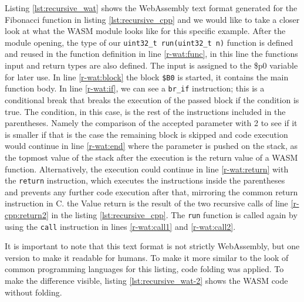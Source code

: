 



Listing \ref{lst:recursive_wat} shows the WebAssembly text format generated for the Fibonacci function in listing \ref{lst:recursive_cpp} and we would like to take a closer look at what the WASM module looks like for this specific example. After the module opening, the type of our \lstinline{uint32_t run(uint32_t n)} function is defined and reused in the function definition in line \ref{r-wat:func}, in this line the functions input and return types are also defined. The input is assigned to the \$p0 variable for later use. In line \ref{r-wat:block} the block \lstinline{$B0} is started, it contains the main function body. In line \ref{r-wat:if}, we can see a \lstinline{br_if} instruction; this is a conditional break that breaks the execution of the passed block if the condition is true. The condition, in this case, is the rest of the instructions included in the parentheses. Namely the comparison of the accepted parameter with 2 to see if it is smaller if that is the case the remaining block is skipped and code execution would continue in line \ref{r-wat:end} where the parameter is pushed on the stack, as the topmost value of the stack after the execution is the return value of a WASM function. Alternatively, the execution could continue in line \ref{r-wat:return} with the \lstinline{return} instruction, which executes the instructions inside the parentheses and prevents any further code execution after that, mirroring the common return instruction in C. the Value return is the result of the two recursive calls of line \ref{r-cpp:return2} in the listing \ref{lst:recursive_cpp}. The \lstinline{run} function is called again by using the \lstinline{call} instruction in lines \ref{r-wat:call1} and \ref{r-wat:call2}.

It is important to note that this text format is not strictly WebAssembly, but one version to make it readable for humans. To make it more similar to the look of common programming languages for this listing, code folding was applied. To make the difference visible, listing \ref{lst:recursive_wat-2} shows the WASM code without folding.


